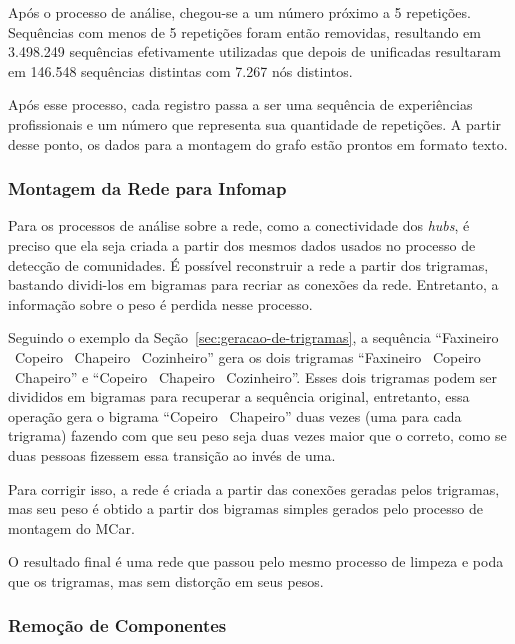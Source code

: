 \documentclass[12pt,a4paper]{article}
\begin{document}
Após o processo de análise, chegou-se a um número próximo a 5 repetições. Sequências com menos de 5 repetições foram então removidas, resultando em 3.498.249 sequências efetivamente utilizadas que depois de unificadas resultaram em 146.548 sequências distintas com 7.267 nós distintos.

Após esse processo, cada registro passa a ser uma sequência de experiências profissionais e um número que representa sua quantidade de repetições. A partir desse ponto, os dados para a montagem do grafo estão prontos em formato texto.


\subsubsection{Montagem da Rede para Infomap} \label{sec:montagem-da-rede}

Para os processos de análise sobre a rede, como a conectividade dos \textit{hubs}, é preciso que ela seja criada a partir dos mesmos dados usados no processo de detecção de comunidades. É possível reconstruir a rede a partir dos trigramas, bastando dividi-los em bigramas para recriar as conexões da rede. Entretanto, a informação sobre o peso é perdida nesse processo.

Seguindo o exemplo da Seção~\ref{sec:geracao-de-trigramas}, a sequência \enquote{Faxineiro \textrightarrow~Copeiro \textrightarrow~Chapeiro \textrightarrow~Cozinheiro} gera os dois trigramas \enquote{Faxineiro \textrightarrow~Copeiro \textrightarrow~Chapeiro} e \enquote{Copeiro \textrightarrow~Chapeiro \textrightarrow~Cozinheiro}. Esses dois trigramas podem ser divididos em bigramas para recuperar a sequência original, entretanto, essa operação gera o bigrama \enquote{Copeiro \textrightarrow~Chapeiro} duas vezes (uma para cada trigrama) fazendo com que seu peso seja duas vezes maior que o correto, como se duas pessoas fizessem essa transição ao invés de uma.

Para corrigir isso, a rede é criada a partir das conexões geradas pelos trigramas, mas seu peso é obtido a partir dos bigramas simples gerados pelo processo de montagem do MCar.

O resultado final é uma rede que passou pelo mesmo processo de limpeza e poda que os trigramas, mas sem distorção em seus pesos.


\subsubsection{Remoção de Componentes} \label{sec:remocao-de-componentes}
\end{document}
